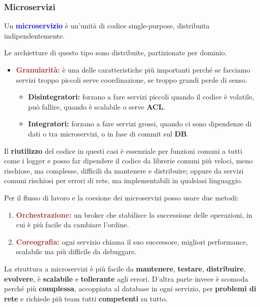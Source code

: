 \subsubsection{Microservizi}
\begin{boxDef}
Un \textbf{\textcolor{blue}{microservizio}} è un'unità di codice single-purpose, distribuita indipendentemente.
\end{boxDef}
Le archietture di questo tipo sono distribuite, partizionate per dominio. 
\begin{itemize}
    \item \textbf{\textcolor{brown}{Granularità:}} è una delle caratteristiche più importanti perché se facciamo servizi troppo piccoli serve coordinazione, se troppo grandi perde di senso.
    \begin{itemize}
        \item \textbf{Disintegratori:} forzano a fare servizi piccoli quando il codice è volatile, può fallire, quando è scalabile o serve \textbf{ACL}.
        \item \textbf{Integratori:} forzano a fare servizi grossi, quando ci sono dipendenze di dati o tra microservizi, o in fase di commit sul \textbf{DB}.
    \end{itemize}
\end{itemize}
Il \textbf{riutilizzo} del codice in questi casi è essenziale per funzioni comuni a tutti come i logger e posso far dipendere il codice da librerie comuni più veloci, meno rischiose, ma complesse, difficili da mantenere e distribuire; oppure da servizi comuni rischiosi per errori di rete, ma implementabili in qualsiasi linguaggio.

\vspace*{0.02\textheight}
Per il flusso di lavoro e la coesione dei microservizi posso usare due metodi:
\begin{enumerate}
    \item \textbf{\textcolor{brown}{Orchestrazione:}} un broker che stabilisce la successione delle operazioni, in cui è più facile da cambiare l'ordine.
    \item \textbf{\textcolor{brown}{Coreografia:}} ogni servizio chiama il suo successore, migliori performance, scalabile ma più difficile da debuggare.
\end{enumerate}
La struttura a microservizi è più facile da \textbf{mantenere}, \textbf{testare}, \textbf{distribuire}, \textbf{evolvere}, è \textbf{scalabile} e \textbf{tollerante} agli errori. D'altra parte invece è scomoda perché più \textbf{complessa}, accoppiata al database in ogni servizio, per \textbf{problemi di rete} e richiede più team tutti \textbf{competenti} su tutto.

